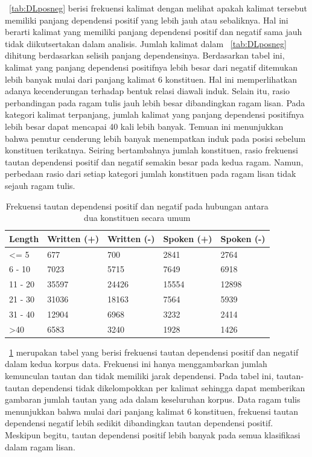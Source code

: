 \documentclass[10pt, a4paper, conference, compsocconf]{IEEEtran}
\begin{document}
\tab~\ref{tab:DLposneg} berisi frekuensi kalimat dengan melihat apakah kalimat tersebut memiliki panjang dependensi positif yang lebih jauh atau sebaliknya. Hal ini berarti kalimat yang memiliki panjang dependensi positif dan negatif sama jauh tidak diikutsertakan dalam analisis. Jumlah kalimat dalam \tab~\ref{tab:DLposneg} dihitung berdasarkan selisih panjang dependensinya. Berdasarkan tabel ini, kalimat yang panjang dependensi positifnya lebih besar dari negatif ditemukan lebih banyak mulai dari panjang kalimat 6 konstituen. Hal ini memperlihatkan adanya kecenderungan terhadap bentuk relasi diawali induk. Selain itu, rasio perbandingan pada ragam tulis jauh lebih besar dibandingkan ragam lisan. Pada kategori kalimat terpanjang, jumlah kalimat yang panjang dependensi positifnya lebih besar dapat mencapai 40 kali lebih banyak.  Temuan ini menunjukkan bahwa penutur cenderung lebih banyak menempatkan induk pada posisi sebelum konstituen terikatnya. Seiring bertambahnya jumlah konstituen, rasio frekuensi tautan dependensi positif dan negatif semakin besar pada kedua ragam. Namun, perbedaan rasio dari setiap kategori jumlah konstituen pada ragam lisan tidak sejauh ragam tulis. 

\begin{table}
\begin{center}
\caption{Frekuensi tautan dependensi positif dan negatif pada hubungan antara dua konstituen secara umum}  \label{tab:tautanposneg}
\begin{tabular}{p{1.1cm} p{1.2cm} p{1.2cm} p{1.3cm} p{1.3cm}}
    \hline
Length & Written (+) & Written (-) & Spoken (+) & Spoken (-) \\ \hline
\textless= 5 & 677 & 700 & 2841 & 2764 \\
6 - 10 & 7023 & 5715 & 7649 & 6918 \\
11 - 20 & 35597 & 24426 & 15554 & 12898 \\
21 - 30 & 31036 & 18163 & 7564 & 5939 \\
31 - 40 & 12904 & 6968 & 3232 & 2414 \\
\textgreater 40 & 6583 & 3240 & 1928 & 1426 \\ \hline
   \end{tabular}
\end{center}
\end{table}

\tab~\ref{tab:tautanposneg} merupakan tabel yang berisi frekuensi tautan dependensi positif dan negatif dalam kedua korpus data. Frekuensi ini hanya menggambarkan jumlah kemunculan tautan dan tidak memiliki jarak dependensi. Pada tabel ini, tautan-tautan dependensi tidak dikelompokkan per kalimat sehingga dapat memberikan gambaran jumlah tautan yang ada dalam keseluruhan korpus. Data ragam tulis menunjukkan bahwa mulai dari panjang kalimat 6 konstituen, frekuensi tautan dependensi negatif lebih sedikit dibandingkan tautan dependensi positif. Meskipun begitu, tautan dependensi positif lebih banyak pada semua klasifikasi dalam ragam lisan. 
\end{document}
